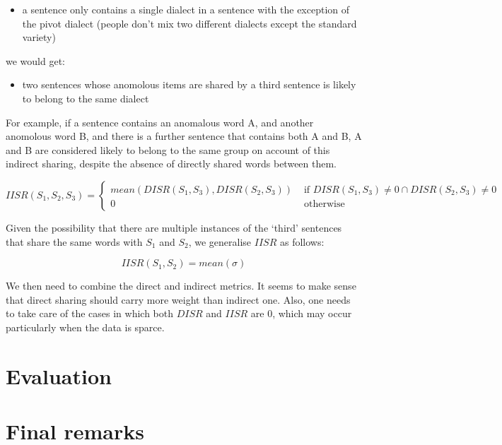 \documentclass{article}
\begin{document}
\begin{itemize}
\item{a sentence only contains a single dialect in a sentence with the exception of the pivot dialect (people don't mix two different dialects except the standard variety)}
\end{itemize}

\noindent we would get:

\begin{itemize}
\item{two sentences whose anomolous items are shared by a third sentence is likely to belong to the same dialect}
\end{itemize}

For example, if a sentence contains an anomalous word A, and another anomolous word B, and there is a further sentence that contains both A and B, A and B are considered likely to belong to the same group on account of this indirect sharing, despite the absence of directly shared words between them. 

\begin{equation}
  \label{eq:2}
 IISR(S_1,S_2,S_3)= \begin{cases} mean( DISR(S_1,S_3), DISR(S_2,S_3) ) & \text{ if } DISR(S_1,S_3) \neq{} 0 \cap{} DISR(S_2,S_3) \neq{} 0   \\0 & \text{ otherwise} \end{cases}
\end{equation}

Given the possibility that there are multiple instances of the `third' sentences that share the same words with $S_1$ and $S_2$, we generalise $IISR$ as follows:

\begin{equation}
  \label{eq:3}
 IISR(S_1,S_2)= mean(\sigma ) 
\end{equation}


We then need to combine the direct and indirect metrics. It seems to make sense that direct sharing should carry more weight than indirect one. Also, one needs to take care of the cases in which both $DISR$ and $IISR$ are 0, which may occur particularly when the data is sparce.  



\section{Evaluation}



\section{Final remarks}
\end{document}
